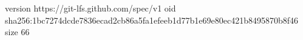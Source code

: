 version https://git-lfs.github.com/spec/v1
oid sha256:1bc7274dcde7836ecad2cb86a5fa1efeeb1d77b1e69e80ec421b8495870b8f46
size 66
